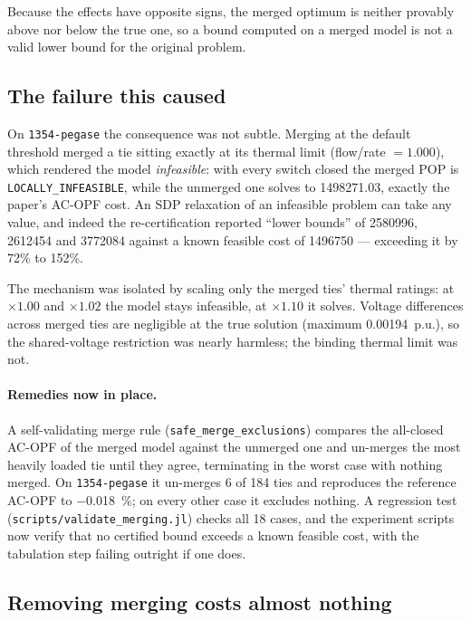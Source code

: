 \documentclass[11pt]{article}
\newcommand{\code}[1]{\texttt{\small #1}}
\begin{document}
Because the effects have opposite signs, the merged optimum is neither provably above nor below the true
one, so a bound computed on a merged model is not a valid lower bound for the original problem.

\subsection{The failure this caused}

On \code{1354-pegase} the consequence was not subtle. Merging at the default threshold merged a tie
sitting exactly at its thermal limit (flow/rate $=1.000$), which rendered the model \emph{infeasible}:
with every switch closed the merged POP is \code{LOCALLY\_INFEASIBLE}, while the unmerged one solves to
\num{1498271.03}, exactly the paper's AC-OPF cost. An SDP relaxation of an infeasible problem can take
any value, and indeed the re-certification reported ``lower bounds'' of \num{2580996}, \num{2612454} and
\num{3772084} against a known feasible cost of \num{1496750} --- exceeding it by 72\% to 152\%.

The mechanism was isolated by scaling only the merged ties' thermal ratings: at $\times 1.00$ and
$\times 1.02$ the model stays infeasible, at $\times 1.10$ it solves. Voltage differences across merged
ties are negligible at the true solution (maximum \num{0.00194}~p.u.), so the shared-voltage restriction
was nearly harmless; the binding thermal limit was not.

\paragraph{Remedies now in place.} A self-validating merge rule
(\code{safe\_merge\_exclusions}) compares the all-closed AC-OPF of the merged model against the unmerged
one and un-merges the most heavily loaded tie until they agree, terminating in the worst case with
nothing merged. On \code{1354-pegase} it un-merges 6 of 184 ties and reproduces the reference AC-OPF to
\SI{-0.018}{\percent}; on every other case it excludes nothing. A regression test
(\code{scripts/validate\_merging.jl}) checks all 18 cases, and the experiment scripts now verify that no
certified bound exceeds a known feasible cost, with the tabulation step failing outright if one does.

\subsection{Removing merging costs almost nothing}
\end{document}
